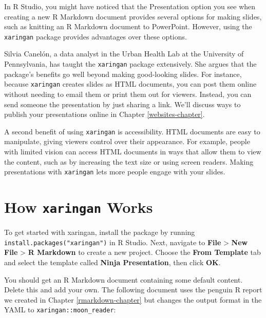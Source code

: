 \documentclass[
]{book}
\begin{document}
In R Studio, you might have noticed that the Presentation option you see when creating a new R Markdown document provides several options for making slides, such as knitting an R Markdown document to PowerPoint. However, using the \texttt{xaringan} package provides advantages over these options.

Silvia Canelón, a data analyst in the Urban Health Lab at the University of Pennsylvania, has taught the \texttt{xaringan} package extensively. She argues that the package's benefits go well beyond making good-looking slides. For instance, because \texttt{xaringan} creates slides as HTML documents, you can post them online without needing to email them or print them out for viewers. Instead, you can send someone the presentation by just sharing a link. We'll discuss ways to publish your presentations online in Chapter \ref{websites-chapter}.

A second benefit of using \texttt{xaringan} is accessibility. HTML documents are easy to manipulate, giving viewers control over their appearance. For example, people with limited vision can access HTML documents in ways that allow them to view the content, such as by increasing the text size or using screen readers. Making presentations with \texttt{xaringan} lets more people engage with your slides.

\hypertarget{how-xaringan-works}{%
\section*{\texorpdfstring{How \texttt{xaringan} Works}{How xaringan Works}}\label{how-xaringan-works}}

To get started with xaringan, install the package by running \texttt{install.packages("xaringan")} in R Studio. Next, navigate to \textbf{File} \textgreater{} \textbf{New File} \textgreater{} \textbf{R Markdown} to create a new project. Choose the \textbf{From Template} tab and select the template called \textbf{Ninja Presentation}, then click \textbf{OK}.

You should get an R Markdown document containing some default content. Delete this and add your own. The following document uses the penguin R report we created in Chapter \ref{rmarkdown-chapter} but changes the output format in the YAML to \texttt{xaringan::moon\_reader}:
\end{document}
